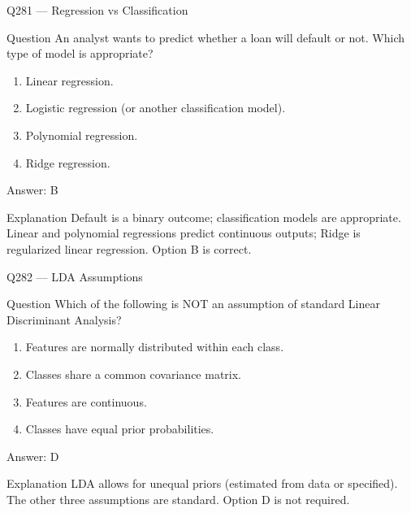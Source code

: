 \documentclass[aspectratio=169,8pt]{beamer}
\begin{document}
\begin{frame}{Q281 --- Regression vs Classification}
\begin{block}{Question}
An analyst wants to predict whether a loan will default or not. Which type of model is appropriate?
\begin{enumerate}
\item Linear regression.
\item Logistic regression (or another classification model).
\item Polynomial regression.
\item Ridge regression.
\end{enumerate}\end{block}
\begin{exampleblock}{Answer: B}\end{exampleblock}
\begin{block}{Explanation}
Default is a binary outcome; classification models are appropriate. Linear and polynomial regressions predict continuous outputs; Ridge is regularized linear regression. Option B is correct.
\end{block}
\end{frame}

\begin{frame}{Q282 --- LDA Assumptions}
\begin{block}{Question}
Which of the following is NOT an assumption of standard Linear Discriminant Analysis?
\begin{enumerate}
\item Features are normally distributed within each class.
\item Classes share a common covariance matrix.
\item Features are continuous.
\item Classes have equal prior probabilities.
\end{enumerate}\end{block}
\begin{exampleblock}{Answer: D}\end{exampleblock}
\begin{block}{Explanation}
LDA allows for unequal priors (estimated from data or specified). The other three assumptions are standard. Option D is not required.
\end{block}
\end{frame}
\end{document}
